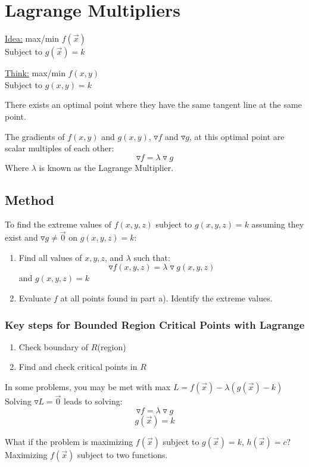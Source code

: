 \documentclass[12pt]{article}
\begin{document}
\section{Lagrange Multipliers}
\underline{Idea:} max/min \(f(\vec{x} ) \) \\
Subject to \(g(\vec{x} ) = k \) 

\underline{Think:} max/min \(f(x,y)\) \\
Subject to \(g(x,y) = k\) 

There exists an optimal point where they have the same tangent line at the same point.

The gradients of \(f(x,y)\) and \(g(x,y)\), \(\triangledown f\) and \(\triangledown g\),  at this optimal point are scalar multiples of each other:
\[
	\triangledown f = \lambda \triangledown g
\]
Where \(\lambda\) is known as the Lagrange Multiplier.

\subsection{Method}
To find the extreme values of \(f(x,y,z)\) subject to \(g(x,y,z) = k\) assuming they exist and \(\triangledown g \neq \vec{0}  \) on \(g(x,y,z) = k\):
\begin{enumerate}
	\item Find all values of \(x,y,z\), and \(\lambda\) such that:
		\[
			\triangledown f(x,y,z) = \lambda \triangledown g(x,y,z)
		\]
		and \(g(x,y,z) = k\) 
	\item Evaluate \(f\) at all points found in part a). Identify the extreme values.
\end{enumerate}

\subsubsection{Key steps for Bounded Region Critical Points with Lagrange}
\begin{enumerate}
	\item Check boundary of \(R\)(region) 
	\item Find and check critical points in \(R\) 
\end{enumerate}

In some problems, you may be met with max \(L = f(\vec{x} ) - \lambda(g(\vec{x} ) - k)  \) \\
Solving \(\triangledown L = \vec{0}  \) leads to solving:
\[
	\triangledown f = \lambda \triangledown g
\]
\[
	g(\vec{x} ) = k 
\]

What if the problem is maximizing \(f(\vec{x} ) \) subject to \(g(\vec{x} ) = k \), \(h(\vec{x} ) = c \)?\\
Maximizing \(f(\vec{x} ) \) subject to two functions.
\end{document}
